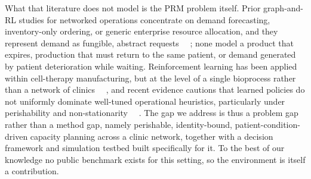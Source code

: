 \documentclass[preprint,review,12pt,nonatbib]{elsarticle}
\providecommand{\DIFadd}[1]{{\protect\color{blue}#1}} %
\providecommand{\DIFdel}[1]{} %
\providecommand{\DIFaddbegin}{} %
\providecommand{\DIFaddend}{} %
\providecommand{\DIFdelbegin}{} %
\providecommand{\DIFdelend}{} %
\providecommand{\DIFscaledelfig}{0.5}
\newlength{\DIFdelgraphicswidth} %
\newlength{\DIFdelgraphicsheight} %
\providecommand{\DIFaddincludegraphics}[2][]{{\color{blue}\fbox{\DIFOincludegraphics[#1]{#2}}}} %
\providecommand{\DIFdelincludegraphics}[2][]{%
\sbox{\DIFdelgraphicsbox}{\DIFOincludegraphics[#1]{#2}}%
\settoboxwidth{\DIFdelgraphicswidth}{\DIFdelgraphicsbox} %
\settoboxtotalheight{\DIFdelgraphicsheight}{\DIFdelgraphicsbox} %
\scalebox{\DIFscaledelfig}{%
\parbox[b]{\DIFdelgraphicswidth}{\usebox{\DIFdelgraphicsbox}\\[-\baselineskip] \rule{\DIFdelgraphicswidth}{0em}}\llap{\resizebox{\DIFdelgraphicswidth}{\DIFdelgraphicsheight}{%
\setlength{\unitlength}{\DIFdelgraphicswidth}%
\begin{picture}(1,1)%
\thicklines\linethickness{2pt} %
{\color[rgb]{1,0,0}\put(0,0){\framebox(1,1){}}}%
{\color[rgb]{1,0,0}\put(0,0){\line( 1,1){1}}}%
{\color[rgb]{1,0,0}\put(0,1){\line(1,-1){1}}}%
\end{picture}%
}\hspace*{3pt}}} %
} %
\DeclareRobustCommand{\DIFaddbegin}{\DIFOaddbegin \let\includegraphics\DIFaddincludegraphics} %
\DeclareRobustCommand{\DIFaddend}{\DIFOaddend \let\includegraphics\DIFOincludegraphics} %
\DeclareRobustCommand{\DIFdelbegin}{\DIFOdelbegin \let\includegraphics\DIFdelincludegraphics} %
\DeclareRobustCommand{\DIFdelend}{\DIFOaddend \let\includegraphics\DIFOincludegraphics} %
\begin{document}
\DIFadd{What that literature does not model is the PRM problem itself. Prior graph-and-RL studies for networked operations concentrate on demand forecasting, inventory-only ordering, or generic enterprise resource allocation, and they represent demand as fungible, abstract requests~\mbox{%
\cite{Kotecha2024GNNMARL, Ahn2024GSP, Mousa2023DecInvMARL, Bermudez2023DCPO, Eisenach2024NeuralCoordination}}\hskip0pt%
; none model a product that expires, production that must return to the same patient, or demand generated by patient deterioration while waiting. Reinforcement learning has been applied within cell-therapy manufacturing, but at the level of a single bioprocess rather than a network of clinics~\mbox{%
\cite{Zheng2022HybridMBRL}}\hskip0pt%
, and recent evidence cautions that learned policies do not uniformly dominate well-tuned operational heuristics, particularly under perishability and non-stationarity~\mbox{%
\cite{Stranieri2025PharmaDRL}}\hskip0pt%
. The gap we address is thus a problem gap rather than a method gap, namely perishable, identity-bound, patient-condition-driven capacity planning across a clinic network, together with a decision framework and simulation testbed built specifically for it. }\DIFaddend To the best of our knowledge \DIFdelbegin \DIFdel{, limited prior work has addressed graph-aware continuous control for distributed personalized regenerative medicine manufacturing networks.
Recent supply-chain graph learning studies suggest that explicit graph structure can improve learning from supply-chain networks, although much of this literature remains focused on prediction, inference, or inventory-only control rather than continuous operational control in patient-specific manufacturing systems~\mbox{%
\cite{Chang2025AAAI, Ahn2024GSP, Kotecha2024GNNMARL}}\hskip0pt%
.
}\DIFdelend \DIFaddbegin \DIFadd{no public benchmark exists for this setting, so the environment is itself a contribution.
}\DIFaddend 
\end{document}
